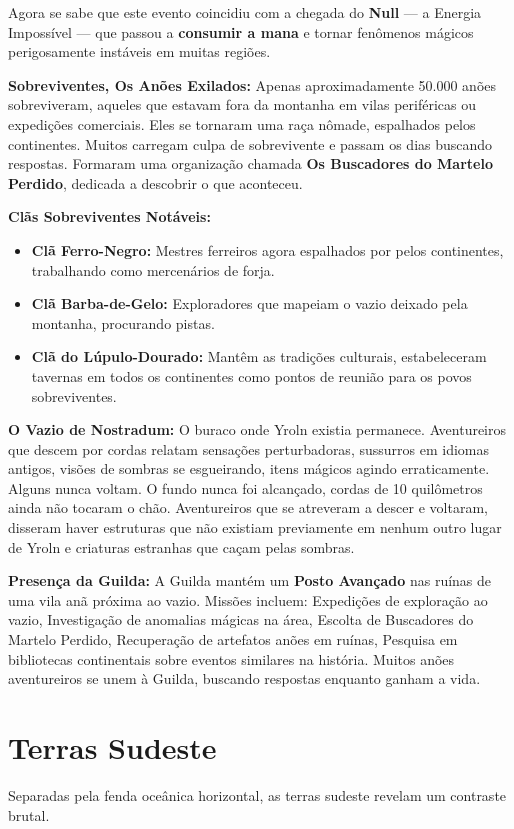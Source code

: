 Agora se sabe que este evento coincidiu com a chegada do \textbf{Null} — a Energia Impossível — que passou a \textbf{consumir a mana } e tornar fenômenos mágicos perigosamente instáveis em muitas regiões.

\textbf{\ringmfamily Sobreviventes, Os Anões Exilados:}
Apenas aproximadamente 50.000 anões sobreviveram, aqueles que estavam fora da montanha em vilas periféricas ou expedições comerciais. Eles se tornaram uma raça nômade, espalhados pelos continentes. Muitos carregam culpa de sobrevivente e passam os dias buscando respostas. Formaram uma organização chamada \textbf{Os Buscadores do Martelo Perdido}, dedicada a descobrir o que aconteceu.

\textbf{\ringmfamily Clãs Sobreviventes Notáveis:}
\begin{itemize}
    \item \textbf{\ringmfamily Clã Ferro-Negro:} Mestres ferreiros agora espalhados por pelos continentes, trabalhando como mercenários de forja.
    \item \textbf{\ringmfamily Clã Barba-de-Gelo:} Exploradores que mapeiam o vazio deixado pela montanha, procurando pistas.
    \item \textbf{\ringmfamily Clã do Lúpulo-Dourado:} Mantêm as tradições culturais, estabeleceram tavernas em todos os continentes como pontos de reunião para os povos sobreviventes.
\end{itemize}

\textbf{\ringmfamily O Vazio de Nostradum:}
O buraco onde Yroln existia permanece. Aventureiros que descem por cordas relatam sensações perturbadoras, sussurros em idiomas antigos, visões de sombras se esgueirando, itens mágicos agindo erraticamente. Alguns nunca voltam. O fundo nunca foi alcançado, cordas de 10 quilômetros ainda não tocaram o chão. Aventureiros que se atreveram a descer e voltaram, disseram haver estruturas que não existiam previamente em nenhum outro lugar de Yroln e criaturas estranhas que caçam pelas sombras.

\textbf{\ringmfamily Presença da Guilda:}
A Guilda mantém um \textbf{Posto Avançado} nas ruínas de uma vila anã próxima ao vazio. Missões incluem: Expedições de exploração ao vazio, Investigação de anomalias mágicas na área, Escolta de Buscadores do Martelo Perdido, Recuperação de artefatos anões em ruínas, Pesquisa em bibliotecas continentais sobre eventos similares na história.
Muitos anões aventureiros se unem à Guilda, buscando respostas enquanto ganham a vida.

\section*{Terras Sudeste}
Separadas pela fenda oceânica horizontal, as terras sudeste revelam um contraste brutal.

